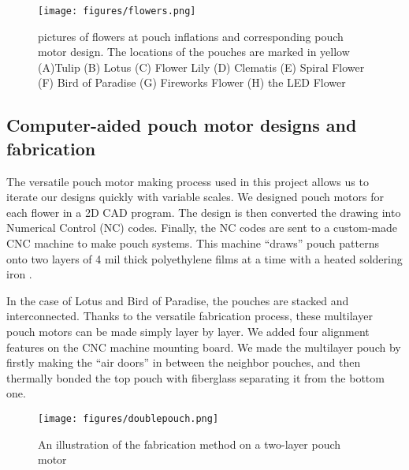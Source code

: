 \documentclass[letterpaper, 10 pt, conference]{ieeeconf}  %
\begin{document}
\begin{figure}[thpb]
	\centering
	\texttt{[image: figures/flowers.png]}
	\caption{pictures of flowers at pouch inflations and corresponding pouch motor design. The locations of the pouches are marked in yellow (A)Tulip (B) Lotus (C) Flower Lily (D) Clematis (E) Spiral Flower (F) Bird of Paradise (G) Fireworks Flower (H) the LED Flower }
	\label{flowers}
\end{figure}

\subsection{Computer-aided pouch motor designs and fabrication}

The versatile pouch motor making process used in this project allows us to iterate our designs quickly with variable scales. We designed pouch motors for each flower in a 2D CAD program. The design is then converted the drawing into Numerical Control (NC) codes. Finally, the NC codes are sent to a custom-made CNC machine to make pouch systems. This machine ``draws'' pouch patterns onto two layers of 4 mil thick polyethylene films at a time with a heated soldering iron \cite{NiiyamaIJRR2014}. %

In the case of Lotus and Bird of Paradise, the pouches are stacked and interconnected. Thanks to the versatile fabrication process, these multilayer pouch motors can be made simply layer by layer. We added four alignment features on the CNC machine mounting board. We made the multilayer pouch by firstly making the ``air doors'' in between the neighbor pouches, and then thermally bonded the top pouch with fiberglass separating it from the bottom one.

\begin{figure}[thpb]
	\centering
	\texttt{[image: figures/doublepouch.png]}
	\caption{An illustration of the fabrication method on a two-layer pouch motor}
	\label{doublepouch}
\end{figure}





\addtolength{\textheight}{-12cm}   %




\end{document}
